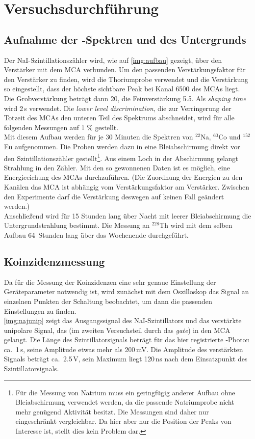 \section{Versuchsdurchführung}

\subsection{Aufnahme der \textgamma-Spektren und des Untergrunds}
Der NaI-Szintillationszähler wird, wie auf \autoref{img:aufbau} gezeigt, über den Verstärker mit
dem MCA verbunden.
Um den passenden Verstärkungsfaktor für den Verstärker zu finden, wird die Thoriumprobe verwendet
und die Verstärkung so eingestellt, dass der höchste sichtbare Peak bei Kanal 6500 des MCAs liegt.
Die Grobverstärkung beträgt dann 20, die Feinverstärkung 5.5. Als \emph{shaping time} wird 2\,\textmu s verwendet.
Die \emph{lower level discrimination}, die zur Verringerung der Totzeit des MCAs den unteren Teil des
Spektrums abschneidet, wird für alle folgenden Messungen auf 1 \% gestellt.\\
Mit diesem Aufbau werden für je 30 Minuten die Spektren von ${}^{22}$Na, ${}^{60}$Co und ${}^{152}$Eu aufgenommen.
Die Proben werden dazu in eine Bleiabschirmung direkt vor den Szintillationszähler gestellt\footnote{Für die
Messung von Natrium muss ein geringfügig anderer Aufbau ohne Bleiabschirmung verwendet werden,
da die passende Natriumprobe nicht mehr genügend Aktivität besitzt.
Die Messungen sind daher nur eingeschränkt vergleichbar.
Da hier aber nur die Position der Peaks von Interesse ist, stellt dies kein Problem dar.}.
Aus einem Loch in der Abschirmung gelangt Strahlung in den Zähler.
Mit den so gewonnenen Daten ist es möglich, eine Energieeichung des MCAs durchzuführen.
(Die Zuordnung der Energien zu den Kanälen das MCA ist abhängig vom  Verstärkungsfaktor am Verstärker.
Zwischen den Experimente darf die Verstärkung deswegen auf keinen Fall geändert werden.)\\
Anschließend wird für 15 Stunden lang über Nacht mit leerer Bleiabschirmung die Untergrundstrahlung bestimmt.
Die Messung an ${}^{228}$Th wird mit dem selben Aufbau 64~Stunden lang über das Wochenende durchgeführt.



\subsection{Koinzidenzmessung}

Da für die Messung der Koinzidenzen eine sehr genaue Einstellung der Geräteparameter notwendig ist,
wird zunächst mit dem Oszilloskop das Signal an einzelnen Punkten der Schaltung beobachtet,
um dann die passenden Einstellungen zu finden.\\
\autoref{img:najunip} zeigt das Ausgangssignal des NaI-Szintillators und das verstärkte unipolare Signal,
das (im zweiten Versuchsteil durch das \emph{gate}) in den MCA gelangt.
Die Länge des Szintillatorsignals beträgt für das hier registrierte \textgamma-Photon ca.~1\,\textmu s,
seine Amplitude etwas mehr als 200\,mV.
Die Amplitude des verstärkten Signals beträgt ca.~2.5\,V,
sein Maximum liegt 120\,ns nach dem Einsatzpunkt des Szintillatorsignals.

